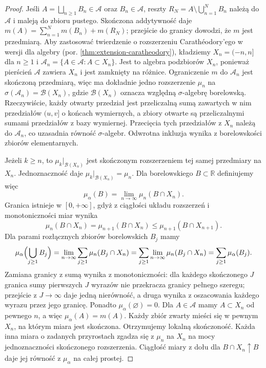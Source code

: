 \begin{proof}
Jeśli $A=\bigsqcup_{n\ge1}B_n\in\mathcal A$ oraz $B_n\in\mathcal A$, reszty $R_N=A\setminus\bigcup_{n=1}^N B_n$ należą do $\mathcal A$ i maleją do zbioru pustego. Skończona addytywność daje $m(A)=\sum_{n=1}^N m(B_n)+m(R_N)$; przejście do granicy dowodzi, że $m$ jest przedmiarą. Aby zastosować twierdzenie o rozszerzeniu Carathéodory'ego
w wersji dla algebry (por. \ref{thm:extension-caratheodory}),
kładziemy $X_n=(-n,n]$ dla $n\ge1$ i
$\mathcal A_n=\{A\in\mathcal A:A\subset X_n\}$.
Jest to algebra podzbiorów $X_n$, ponieważ pierścień
$\mathcal A$ zawiera $X_n$ i jest zamknięty na różnice.
Ograniczenie $m$ do $\mathcal A_n$ jest skończoną
przedmiarą, więc ma dokładnie jedno rozszerzenie
$\mu_n$ na $\sigma(\mathcal A_n)=\mathcal B(X_n)$,
gdzie $\mathcal B(X_n)$ oznacza względną
$\sigma$-algebrę borelowską.
Rzeczywiście, każdy otwarty przedział jest
przeliczalną sumą zawartych w nim przedziałów
$(u,v]$ o końcach wymiernych, a zbiory otwarte są
przeliczalnymi sumami przedziałów z bazy wymiernej.
Przecięcia tych przedziałów z $X_n$ należą do
$\mathcal A_n$, co uzasadnia równość
$\sigma$-algebr. Odwrotna inkluzja wynika
z borelowskości zbiorów elementarnych.

Jeżeli $k\ge n$, to $\mu_k|_{\mathcal B(X_n)}$
jest skończonym rozszerzeniem tej samej przedmiary
na $X_n$. Jednoznaczność daje
$\mu_k|_{\mathcal B(X_n)}=\mu_n$. Dla borelowskiego
$B\subset\mathbb{R}$ definiujemy więc
\[
 \mu_\alpha(B)=\lim_{n\to\infty}\mu_n(B\cap X_n).
\]
Granica istnieje w $[0,+\infty]$, gdyż z ciągłości
układu rozszerzeń i monotoniczności miar wynika
\[
 \mu_n(B\cap X_n)=\mu_{n+1}(B\cap X_n)
 \le\mu_{n+1}(B\cap X_{n+1}).
\]
Dla parami rozłącznych zbiorów borelowskich $B_j$
mamy
\[
 \mu_\alpha\Bigl(\bigcup_{j\ge1}B_j\Bigr)
 =\lim_{n\to\infty}\sum_{j\ge1}\mu_n(B_j\cap X_n)
 =\sum_{j\ge1}\lim_{n\to\infty}\mu_n(B_j\cap X_n)
 =\sum_{j\ge1}\mu_\alpha(B_j).
\]
Zamiana granicy z sumą wynika z monotoniczności:
dla każdego skończonego $J$ granica sumy pierwszych
$J$ wyrazów nie przekracza granicy pełnego szeregu;
przejście z $J\to\infty$ daje jedną nierówność,
a druga wynika z oszacowania każdego wyrazu
przez jego granicę. Ponadto $\mu_\alpha(\varnothing)=0$.
Dla $A\in\mathcal A$ mamy $A\subset X_n$ od
pewnego $n$, a więc $\mu_\alpha(A)=m(A)$.
Każdy zbiór zwarty mieści się w pewnym $X_n$,
na którym miara jest skończona. Otrzymujemy
lokalną skończoność. Każda inna miara o zadanych
przyrostach zgadza się z $\mu_n$ na $X_n$ na mocy
jednoznaczności skończonego rozszerzenia.
Ciągłość miary z dołu dla $B\cap X_n\uparrow B$
daje jej równość z $\mu_\alpha$ na całej prostej.


\end{proof}
